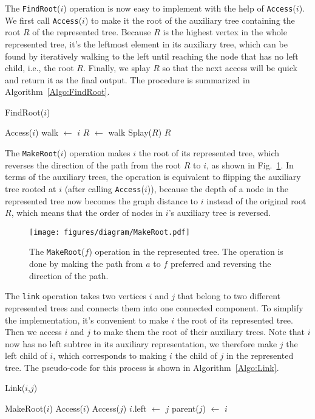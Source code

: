 The \texttt{FindRoot}($i$) operation is now easy to implement with the help of \texttt{Access}($i$). We first call \texttt{Access}($i$)
to make it the root of the auxiliary tree containing the root $R$ of the represented tree. Because $R$ is the highest vertex
in the whole represented tree, it's the leftmost element in its auxiliary tree, which can be found by iteratively walking
to the left until reaching the node that has no left child, i.e., the root $R$. Finally, we splay $R$ so that the next access will be quick
and return it as the final output. The procedure is summarized in Algorithm~\ref{Algo:FindRoot}.
\begin{algorithm}
\SetNoFillComment
\caption{FindRoot($i$)} \label{Algo:FindRoot}
    Access($i$)\;
    walk $\leftarrow$ $i$\;
    $R$ $\leftarrow$ walk
    Splay($R$)\;
    \Return $R$\;
\end{algorithm}

The \texttt{MakeRoot}($i$) operation makes $i$ the root of its represented tree, which reverses
the direction of the path from the root $R$ to $i$, as shown in Fig.~\ref{fig:makeRoot}. In terms of the auxiliary trees, 
the operation is equivalent to flipping the auxiliary tree rooted at $i$ (after calling \texttt{Access}($i$)), because
the depth of a node in the represented tree now becomes the graph distance to $i$ instead of the original root $R$,
which means that the order of nodes in $i$'s auxiliary tree is reversed.
\begin{figure}[h]
  \centering
  \vspace{5ex}
  \texttt{[image: figures/diagram/MakeRoot.pdf]}
  \vspace{3ex}
  \caption{The \texttt{MakeRoot}($f$) operation in the represented tree. The operation is done by making the path from $a$ to $f$ preferred and
  reversing the direction of the path.}
  \label{fig:makeRoot}
\end{figure}

The \texttt{link} operation takes two vertices $i$ and $j$ that belong to two different represented trees and connects them into one
connected component. To simplify the implementation, it's convenient to make $i$ the root of its represented tree. Then we 
access $i$ and $j$ to make them the root of their auxiliary trees. Note that $i$ now has no left subtree in its auxiliary representation,
we therefore make $j$ the left child of $i$, which corresponds to making $i$ the child of $j$ in the represented tree. The pseudo-code for this process is shown
in Algorithm~\ref{Algo:Link}.
\begin{algorithm}
\SetNoFillComment
\caption{Link($i$,$j$)} \label{Algo:Link}
    MakeRoot($i$)\;
    Access($i$)\;
    Access($j$)\;
    $i$.left $\leftarrow$ $j$\;
    parent($j$) $\leftarrow$ $i$\;
\end{algorithm}

